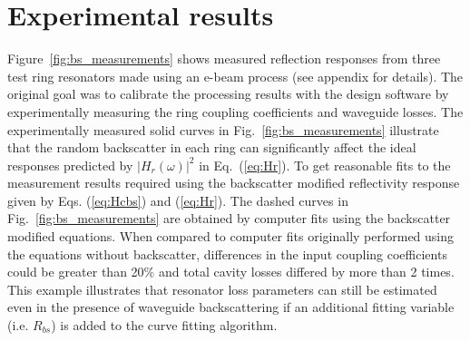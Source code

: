 \documentclass[10pt]{article}
\begin{document}
\section{Experimental results}
Figure~\ref{fig:bs_measurements} shows measured reflection responses from three test ring resonators made using an e-beam process (see appendix for details).
The original goal was to calibrate the processing results with the design software by experimentally measuring the ring coupling coefficients and waveguide losses.
The experimentally measured solid curves in Fig.~\ref{fig:bs_measurements} illustrate that the random backscatter in each ring can significantly affect the ideal responses predicted by $|H_r(\omega)|^2$ in Eq.~(\ref{eq:Hr}).
To get reasonable fits to the measurement results required using the backscatter modified reflectivity response given by Eqs. (\ref{eq:Hcbs}) and (\ref{eq:Hr}).
The dashed curves in Fig.~\ref{fig:bs_measurements} are obtained by computer fits using the backscatter modified equations.
When compared to computer fits originally performed using the equations without backscatter, differences in the input coupling coefficients could be greater than 20$\%$ and total cavity losses differed by more than 2 times.
This example illustrates that resonator loss parameters can still be estimated even in the presence of waveguide backscattering if an additional fitting variable (i.e. $R_{bs}$) is added to the curve fitting algorithm.  



\label{sec:measurements}
\end{document}
